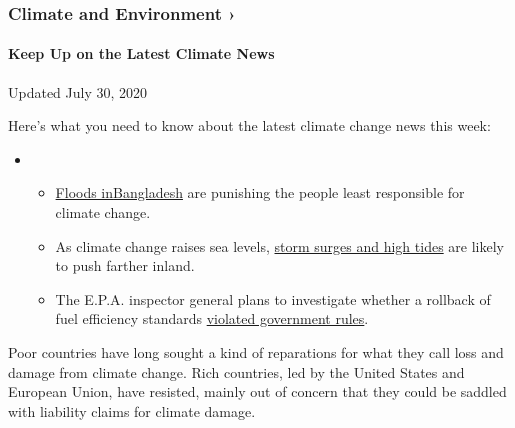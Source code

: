 \href{https://www.nytimes3xbfgragh.onion/section/climate?action=click\&pgtype=Article\&state=default\&region=MAIN_CONTENT_1\&context=storylines_keepup}{}

\hypertarget{climate-and-environment-}{%
\subsubsection{Climate and Environment
›}\label{climate-and-environment-}}

\hypertarget{keep-up-on-the-latest-climate-news}{%
\paragraph{Keep Up on the Latest Climate
News}\label{keep-up-on-the-latest-climate-news}}

Updated July 30, 2020

Here's what you need to know about the latest climate change news this
week:

\begin{itemize}
\item
  \begin{itemize}
  \tightlist
  \item
    \href{https://www.nytimes3xbfgragh.onion/2020/07/30/climate/bangladesh-floods.html?action=click\&pgtype=Article\&state=default\&region=MAIN_CONTENT_1\&context=storylines_keepup}{Floods
    in}\href{https://www.nytimes3xbfgragh.onion/2020/07/30/climate/bangladesh-floods.html?action=click\&pgtype=Article\&state=default\&region=MAIN_CONTENT_1\&context=storylines_keepup}{Bangladesh}
    are punishing the people least responsible for climate change.
  \item
    As climate change raises sea levels,
    \href{https://www.nytimes3xbfgragh.onion/2020/07/30/climate/sea-level-inland-floods.html?action=click\&pgtype=Article\&state=default\&region=MAIN_CONTENT_1\&context=storylines_keepup}{storm
    surges and high tides} are likely to push farther inland.
  \item
    The E.P.A. inspector general plans to investigate whether a rollback
    of fuel efficiency standards
    \href{https://www.nytimes3xbfgragh.onion/2020/07/27/climate/trump-fuel-efficiency-rule.html?action=click\&pgtype=Article\&state=default\&region=MAIN_CONTENT_1\&context=storylines_keepup}{violated
    government rules}.
  \end{itemize}
\end{itemize}

Poor countries have long sought a kind of reparations for what they call
loss and damage from climate change. Rich countries, led by the United
States and European Union, have resisted, mainly out of concern that
they could be saddled with liability claims for climate damage.


